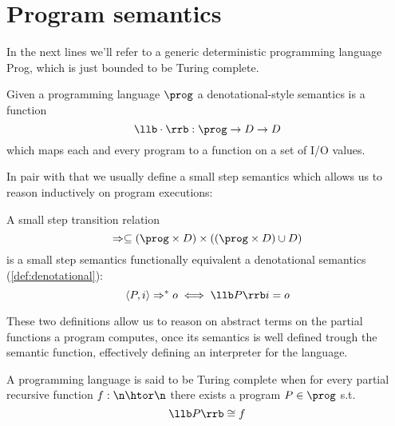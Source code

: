 \section{Program semantics}
In the next lines we'll refer to a generic deterministic programming
language Prog, which is just bounded to be Turing complete.


\begin{definition}\label{def:denotational}
  Given a programming language \(\prog\) a denotational-style
  semantics is a function \[ \llb \cdot \rrb : \prog \to D \to D\]
  which maps each and every program to a function on a set of I/O
  values.
\end{definition}

In pair with that we usually define a small step semantics which
allows us to reason inductively on program executions:

\begin{definition}
  A small step transition relation \[\Rightarrow \subseteq (\prog
  \times D) \times ((\prog \times D) \cup D)\] is a small step
  semantics functionally equivalent a denotational semantics
  (\ref{def:denotational}): \[\langle P, i \rangle \Rightarrow^* o
  \iff \llb P \rrb i = o\]
\end{definition}


These two definitions allow us to reason on abstract terms on the
partial functions a program computes, once its semantics is well
defined trough the semantic function, effectively defining an
interpreter for the language.

\begin{definition}\label{def:turingc}
  A programming language is said to be Turing complete when for every
  partial recursive function \(f : \n \htor \n\) there exists a
  program \(P\in \prog\) s.t. \[\llb P \rrb \cong f\]
\end{definition}

